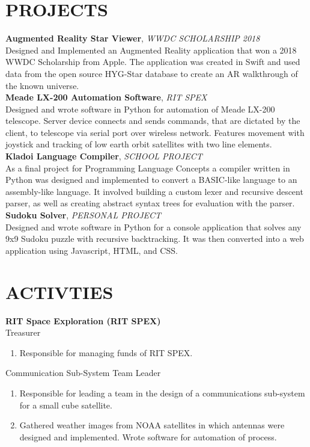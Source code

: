 \documentclass[line, margin]{res}
\begin{document}
\begin{resume}
\section{PROJECTS}
\textbf{Augmented Reality Star Viewer}, \textit{WWDC SCHOLARSHIP 2018}\\
Designed and Implemented an Augmented Reality application that won a 2018 WWDC Scholarship from Apple.  The application was created in Swift and used data from the open source HYG-Star database to create an AR walkthrough of the known universe.
\\ [10pt]
\textbf{Meade LX-200 Automation Software}, \textit{RIT SPEX}\\
Designed and wrote software in Python for automation of Meade LX-200 telescope. Server device connects and sends commands, that are dictated by the client, to telescope via serial port over wireless network. Features movement with joystick and tracking of low earth orbit satellites with two line elements.
\\ [10pt]
\textbf{Kladoi Language Compiler}, \textit{SCHOOL PROJECT}\\
As a final project for Programming Language Concepts a compiler written in Python was designed and implemented to convert a BASIC-like language to an assembly-like language.  It involved building a custom lexer and recursive descent parser, as well as creating abstract syntax trees for evaluation with the parser.
\\ [10pt]
\textbf{Sudoku Solver}, \textit{PERSONAL PROJECT}\\
Designed and wrote software in Python for a console application that solves any 9x9 Sudoku puzzle with recursive backtracking.  It was then converted into a web application using Javascript, HTML, and CSS.


\section{ACTIVTIES}
\textbf{RIT Space Exploration (RIT SPEX)}\\
Treasurer
      \begin{enumerate}
        \item[] Responsible for managing funds of RIT SPEX.
      \end{enumerate}
      
Communication Sub-System Team Leader
      \begin{enumerate}
        \item[] Responsible for leading a team in the design of a communications sub-system for a small cube satellite.
        \item[] Gathered weather images from NOAA satellites in which antennas were designed and implemented. Wrote software for automation of process.
      \end{enumerate}
      


\end{resume}
\end{document}
